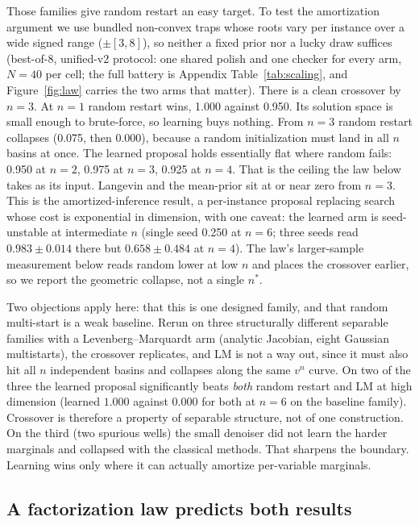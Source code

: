 \documentclass[letterpaper]{article} %
\begin{document}
Those families give random restart an easy target. To test the amortization argument we
use bundled non-convex traps whose roots vary per instance over a wide signed range
($\pm[3,8]$), so neither a fixed prior nor a lucky draw suffices (best-of-8, unified-v2
protocol: one shared polish and one checker for every arm, $N{=}40$ per cell; the full battery
is Appendix Table~\ref{tab:scaling}, and Figure~\ref{fig:law} carries the two arms that
matter).
There is a clean crossover by $n = 3$. At $n = 1$ random restart wins, 1.000 against 0.950.
Its solution space is small enough to brute-force, so learning buys nothing. From $n = 3$
random restart collapses (0.075, then 0.000), because a random initialization must land in
all $n$ basins at once. The learned
proposal holds essentially flat where random fails: 0.950 at $n = 2$, 0.975 at $n = 3$, 0.925
at $n = 4$. That is the ceiling the law below takes as its input.
Langevin and the mean-prior sit at or near zero from $n = 3$. This is the amortized-inference
result, a per-instance proposal replacing search whose cost is exponential in dimension,
with one caveat: the learned arm is seed-unstable at intermediate $n$ (single seed
0.250 at $n = 6$; three seeds read $0.983 \pm 0.014$ there but $0.658 \pm 0.484$ at
$n = 4$). The law's larger-sample measurement below reads random lower at low $n$
and places the crossover earlier, so we report the geometric collapse, not a
single $n^*$.

Two objections apply here: that this is one designed family, and that random multi-start is a
weak baseline. Rerun on three structurally different separable families with a
Levenberg--Marquardt arm (analytic Jacobian, eight Gaussian
multistarts), the crossover replicates, and LM is not a way out, since it must also hit all
$n$ independent basins and collapses along the same $v^n$ curve.
On two of the three the learned
proposal significantly beats \emph{both} random restart and LM at high dimension (learned
$1.000$ against $0.000$ for both at $n = 6$ on the baseline family). Crossover is
therefore a property of separable structure, not of one construction.
On the third (two spurious wells) the small denoiser did not learn the harder
marginals and collapsed with the classical methods. That sharpens the boundary. Learning
wins only where it can actually amortize per-variable marginals.

\subsection{A factorization law predicts both results}
\label{sec:law}
\end{document}
